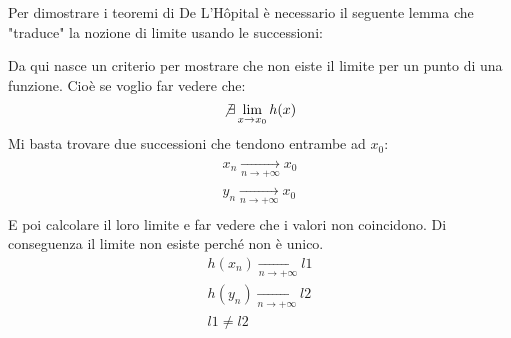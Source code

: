 Per dimostrare i teoremi di De L'Hôpital è necessario il seguente lemma che "traduce" la nozione di limite usando le successioni:

Da qui nasce un criterio per mostrare che non eiste il limite per un punto di una funzione. Cioè se voglio far vedere che:
\begin{equation*}
	\not \exists \lim_{x \to x_0} h(x)
\end{equation*}
Mi basta trovare due successioni che tendono entrambe ad $x_0$:
\begin{align*}
	x_n \xrightarrow[n \to + \infty]{} x_0\\
	y_n \xrightarrow[n \to + \infty]{} x_0\\
\end{align*}
E poi calcolare il loro limite e far vedere che i valori non coincidono. Di conseguenza il limite non esiste perché non è unico.
\begin{gather*}
	h(x_n) \xrightarrow[n \to +\infty]{} l1\\
	h(y_n) \xrightarrow[n \to +\infty]{} l2\\
	l1 \neq l2
\end{gather*}

